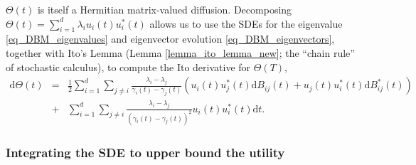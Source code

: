 \documentclass[11pt,letterpaper]{article}
\begin{document}
$\Theta(t)$ is itself a Hermitian matrix-valued diffusion. 
%
  Decomposing $\Theta(t) = \sum_{i=1}^d \lambda_i u_i(t)u_i^\ast(t)$ allows us to use the SDEs for the eigenvalue  \eqref{eq_DBM_eigenvalues}  and eigenvector evolution \eqref{eq_DBM_eigenvectors}, together with Ito’s Lemma (Lemma \ref{lemma_ito_lemma_new}; the ``chain rule'' of stochastic calculus), to compute the Ito derivative for $\Theta(T)$,
%
 \begin{eqnarray} \label{eq_Ito_derivative_Theta}
        \mathrm{d}\Theta(t)    &=&    \frac{1}{2}\sum_{i=1}^{d} \sum_{j \neq i} \frac{\lambda_i - \lambda_j}{\gamma_i(t)-\gamma_j(t)}(u_i(t) u_j^\ast(t)\mathrm{d}B_{ij}(t) + u_j(t) u_i^\ast(t)\mathrm{d}B_{ij}^\ast(t)) \nonumber\\
      &+& \sum_{i=1}^{d} \sum_{j\neq i} \frac{\lambda_i - \lambda_j}{(\gamma_i(t)-\gamma_j(t))^2} u_i(t) u_i^\ast(t) \mathrm{d}t.
\end{eqnarray}

\subsubsection{Integrating the SDE to upper bound the utility}
\end{document}
